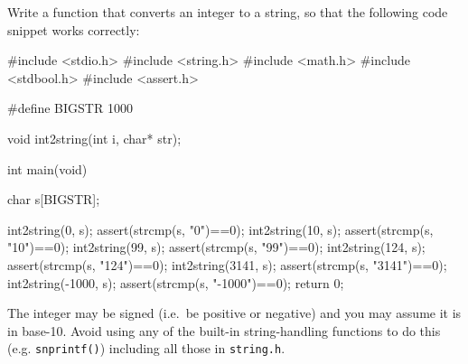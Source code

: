 
\begin{exercise}
Write a function that converts an integer
to a string, so that the following code snippet
works correctly:

\begin{codesnippet}
#include <stdio.h>
#include <string.h>
#include <math.h>
#include <stdbool.h>
#include <assert.h>

#define BIGSTR 1000

void int2string(int i, char* str);

int main(void)
{
   char s[BIGSTR];

   int2string(0, s);
   assert(strcmp(s, "0")==0);
   int2string(10, s);
   assert(strcmp(s, "10")==0);
   int2string(99, s);
   assert(strcmp(s, "99")==0);
   int2string(124, s);
   assert(strcmp(s, "124")==0);
   int2string(3141, s);
   assert(strcmp(s, "3141")==0);
   int2string(-1000, s);
   assert(strcmp(s, "-1000")==0);
   return 0;
}
\end{codesnippet}

The integer may be signed (i.e.\ be positive or negative)
and you may assume it is in base-10.
Avoid using any of the built-in string-handling functions
to do this (e.g. \verb^snprintf()^)
including all those in \verb^string.h^.
\end{exercise}


